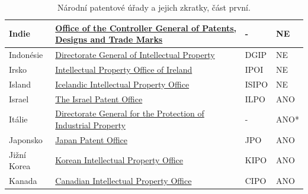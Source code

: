 \begin{table}[H]
\begin{tabular}{|>{\centering\arraybackslash}p{2.2cm}|>{\centering\arraybackslash}p{7cm}|>{\centering\arraybackslash}p{2cm}|>{\centering\arraybackslash}p{1cm}|}
	\hline
	Indie & \href{http://www.ipindia.nic.in/}{Office of the Controller General of Patents, Designs and Trade Marks}  & -    & NE    \\ 
	\hline
	Indonésie & \href{http://www.dgip.go.id/}{Directorate General of Intellectual Property}  & DGIP & NE        \\ 
	\hline
	Irsko & \href{https://www.ipoi.gov.ie/en/}{Intellectual Property Office of Ireland}  & IPOI   & NE      \\ 
	\hline
	Island & \href{https://www.isipo.is/}{Icelandic Intellectual Property Office}  & ISIPO    & NE     \\ 
	\hline
	Israel & \href{https://www.gov.il/en/departments/ilpo}{The Israel Patent Office}  & ILPO    & ANO     \\ 
	\hline
	Itálie & \href{https://uibm.mise.gov.it/index.php/it/}{Directorate General for the Protection of Industrial Property}  & -    & ANO*     \\ 
	\hline
	Japonsko & \href{https://www.jpo.go.jp/e/index.html}{Japan Patent Office}  & JPO  & ANO       \\ 
	\hline
	Jižní Korea & \href{http://www.kipo.go.kr/}{Korean Intellectual Property Office}  & KIPO   & ANO      \\ 
	\hline	
	Kanada & \href{https://www.ic.gc.ca/}{Canadian Intellectual Property Office}  & CIPO  & ANO      \\ 
	\hline
	\end{tabular}
	\caption{Národní patentové úřady a jejich zkratky, část první.}
	\label{tab:table_offices1}
	\end{table}
\newpage
